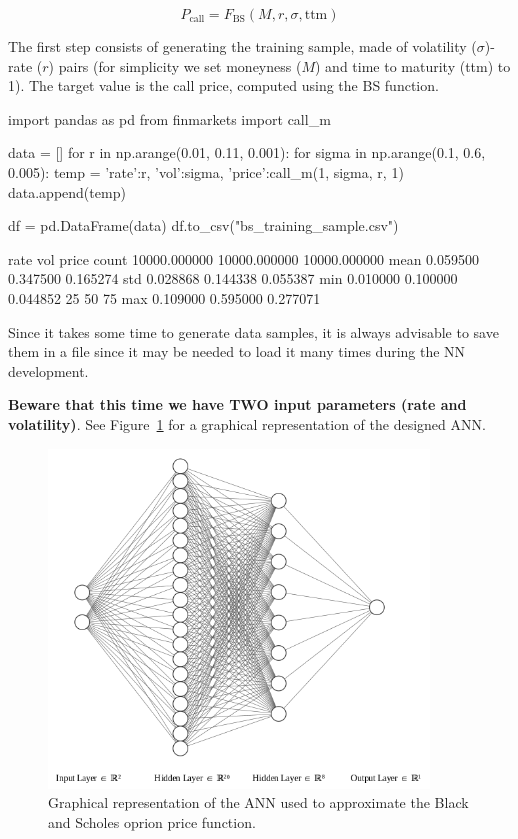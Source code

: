 \begin{equation} 
P_\textrm{call} = F_\textrm{BS}(M, r, \sigma, \mathrm{ttm})
\end{equation}

The first step consists of generating the training sample, made of volatility ($\sigma$)-rate ($r$) pairs (for simplicity we set moneyness ($M$) and time to maturity (ttm) to 1). The target value is the call price, computed using the BS function.

\begin{ipython}
import pandas as pd
from finmarkets import call_m

data = []
for r in np.arange(0.01, 0.11, 0.001):
for sigma in np.arange(0.1, 0.6, 0.005):
temp = {'rate':r, 'vol':sigma, 'price':call_m(1, sigma, r, 1)}
data.append(temp)

df = pd.DataFrame(data)
df.to_csv("bs_training_sample.csv")
\end{ipython}
\begin{ioutput}
	rate           vol         price
	count  10000.000000  10000.000000  10000.000000
	mean       0.059500      0.347500      0.165274
	std        0.028868      0.144338      0.055387
	min        0.010000      0.100000      0.044852
	25%
	50%
	75%
	max        0.109000      0.595000      0.277071
\end{ioutput}

Since it takes some time to generate data samples, it is always advisable to save them in a file since it may be needed to load it many times during the NN development. 

\textbf{Beware that this time we have TWO input parameters (rate and volatility)}. See Figure~\ref{fig:ann_2} for a graphical representation of the designed ANN.

\begin{figure}[htb]
\centering
\includegraphics[width=0.9\textwidth]{figures/ann_2.png}
\caption{Graphical representation of the ANN used to approximate the Black and Scholes oprion price function.}
\label{fig:ann_2}
\end{figure}

